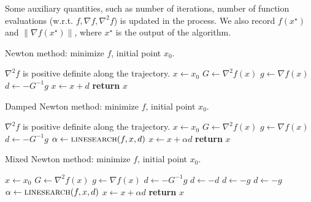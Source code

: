 \documentclass[conference]{IEEEtran}
\begin{document}
Some auxiliary quantities, such as number of iterations, number of function evaluations (w.r.t. $f,\nabla f,\nabla^2 f$) is updated in the process. We also record $f(x^\star)$ and $\|\nabla f(x^\star)\|$, where $x^\star$ is the output of the algorithm.
\begin{algorithm}
    \caption{Newton method: minimize $f$, initial point $x_0$.}\label{newton}
    \begin{algorithmic}[1]
        \Require $\nabla^2 f$ is positive definite along the trajectory.
    \State $x\gets x_0$
    \State $G\gets \nabla^2 f(x)$
    \State $g\gets \nabla f(x)$
    \State $d\gets -G^{-1}g$
    \State $x\gets x+d$
    \EndWhile
    \State \textbf{return} $x$
    \EndProcedure
    \end{algorithmic}
\end{algorithm}

\begin{algorithm}
    \caption{Damped Newton method: minimize $f$, initial point $x_0$.}\label{damped}
    \begin{algorithmic}[1]
        \Require $\nabla^2 f$ is positive definite along the trajectory.
    \State $x\gets x_0$
    \State $G\gets \nabla^2 f(x)$
    \State $g\gets \nabla f(x)$
    \State $d\gets -G^{-1}g$
    \State $\alpha \gets {\textsc{linesearch}}(f, x, d)$
    \State $x\gets x+\alpha d$
    \EndWhile
    \State \textbf{return} $x$
    \EndProcedure
    \end{algorithmic}
\end{algorithm}

\begin{algorithm}
    \caption{Mixed Newton method: minimize $f$, initial point $x_0$.}\label{mixed}
    \begin{algorithmic}[1]
    \State $x\gets x_0$
    \State $G\gets \nabla^2 f(x)$
    \State $g\gets \nabla f(x)$
    \State $d \gets -G^{-1}g$
    \State $d\gets-d$
    \EndIf
    \State $d\gets-g$
    \EndIf
    \Else 
    \State $d \gets -g$
    \EndIf
    \State $\alpha \gets {\textsc{linesearch}}(f, x, d)$
    \State $x\gets x+\alpha d$
    \EndWhile
    \State \textbf{return} $x$
    \EndProcedure
    \end{algorithmic}
\end{algorithm}
\end{document}
